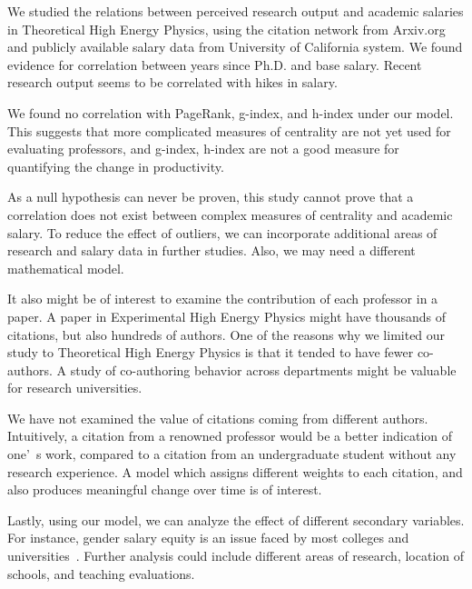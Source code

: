 We studied the relations between perceived research output and academic salaries in Theoretical High Energy Physics, using the citation network from Arxiv.org and publicly available salary data from University of California system. We found evidence for correlation between years since Ph.D. and base salary. Recent research output seems to be correlated with hikes in salary.

We found no correlation with PageRank, g-index, and h-index under our model. This suggests that more complicated measures of centrality are not yet used for evaluating professors, and g-index, h-index are not a good measure for quantifying the change in productivity.

As a null hypothesis can never be proven, this study cannot prove that a correlation does not exist between complex measures of centrality and academic salary. To reduce the effect of outliers, we can incorporate additional areas of research and salary data in further studies. Also, we may need a different mathematical model.

It also might be of interest to examine the contribution of each professor in a paper. A paper in Experimental High Energy Physics might have thousands of citations, but also hundreds of authors. One of the reasons why we limited our study to Theoretical High Energy Physics is that it tended to have fewer co-authors. A study of co-authoring behavior across departments might be valuable for research universities.

We have not examined the value of citations coming from different authors. Intuitively, a citation from a renowned professor would be a better indication of one\textquoteright~s work, compared to a citation from an undergraduate student without any research experience. A model which assigns different weights to each citation, and also produces meaningful change over time is of interest.

Lastly, using our model, we can analyze the effect of different secondary variables. For instance, gender salary equity is an issue faced by most colleges and universities~\cite{becker1995}. Further analysis could include different areas of research, location of schools, and teaching evaluations.

